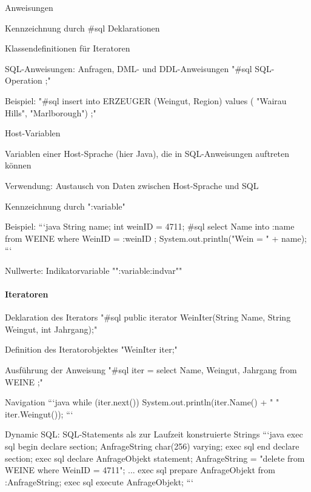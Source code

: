 \documentclass[a4paper]{article}
\begin{document}
\begin{multicols}{3}
Anweisungen
\begin{itemize*}
    \item Kennzeichnung durch \#sql Deklarationen
    \item Klassendefinitionen für Iteratoren
    \item SQL-Anweisungen: Anfragen, DML- und DDL-Anweisungen "\#sql { SQL-Operation };"
    \item Beispiel: "\#sql { insert into ERZEUGER (Weingut, Region) values ( "Wairau Hills", "Marlborough") };"
\end{itemize*}

Host-Variablen
\begin{itemize*}
    \item Variablen einer Host-Sprache (hier Java), die in SQL-Anweisungen auftreten können
    \item Verwendung: Austausch von Daten zwischen Host-Sprache und SQL
    \item Kennzeichnung durch ":variable"
    \item Beispiel:
    ```java
    String name;
    int weinID = 4711;
    \#sql { select Name into :name
    from WEINE where WeinID = :weinID };
    System.out.println("Wein = " + name);
    ```
    \item Nullwerte: Indikatorvariable "":variable:indvar""
\end{itemize*}

\paragraph{Iteratoren}
\begin{enumerate*}
    \item Deklaration des Iterators "\#sql public iterator WeinIter(String Name, String Weingut, int Jahrgang);"
    \item Definition des Iteratorobjektes "WeinIter iter;"
    \item Ausführung der Anweisung "\#sql iter = { select Name, Weingut, Jahrgang from WEINE };"
    \item Navigation
    ```java
    while (iter.next()) {
            System.out.println(iter.Name() + " " iter.Weingut());
        }
    ```
\end{enumerate*}

Dynamic SQL: SQL-Statements als zur Laufzeit konstruierte Strings
```java
exec sql begin declare section;
AnfrageString char(256) varying;
exec sql end declare section;
exec sql declare AnfrageObjekt statement;
AnfrageString = "delete from WEINE where WeinID = 4711";
...
exec sql prepare AnfrageObjekt from :AnfrageString;
exec sql execute AnfrageObjekt;
```


\end{multicols}
\end{document}
